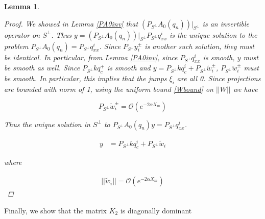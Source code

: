 \documentclass[12pt]{article}
\newtheorem{lemma}{Lemma}
\begin{document}
\begin{lemma}
\begin{proof}
We showed in Lemma \ref{PA0inv} that $(P_{S^\perp} A_0(q_n))|_{S^\perp}$ is an invertible operator on $S^\perp$. Thus $y = (P_{S^\perp} A_0(q_n))|_{S^\perp} P_{S^\perp} q^i_{xx}$ is the unique solution to the problem $P_{S^\perp} A_0(q_n) = P_{S^\perp} q^i_{xx}$. Since $P_{S^\perp} y_i^\pm$ is another such solution, they must be identical. In particular, from Lemma \ref{PA0inv}, since $P_{S^\perp} q^i_{xx}$ is smooth, $y$ must be smooth as well. Since $P_{S^\perp} k q^+_c$ is smooth and $y = P_{S^\perp} k q^i_c + P_{S^\perp} \tilde{w}_i^\pm$, $P_{S^\perp} \tilde{w}_i^\pm$ must be smooth. In particular, this implies that the jumps $\xi_i$ are all 0. Since projections are bounded with norm of 1, using the uniform bound \eqref{Wbound} on $||W||$ we have 

\[
P_{S^\perp} \tilde{w}_i^\pm = \mathcal{O}(e^{-2 \alpha X_m})
\]

Thus the unique solution in $S^\perp$ to $P_{S^\perp} A_0(q_n) y = P_{S^\perp} q^i_{xx}$.

\begin{align*}
y &= P_{S^\perp} k q^i_c + P_{S^\perp} \tilde{w}_i
\end{align*}

where

\begin{align*}
||\tilde{w}_i|| = \mathcal{O}(e^{-2 \alpha X_m})
\end{align*}

\end{proof}
\end{lemma}

Finally, we show that the matrix $K_2$ is diagonally dominant

\end{document}
